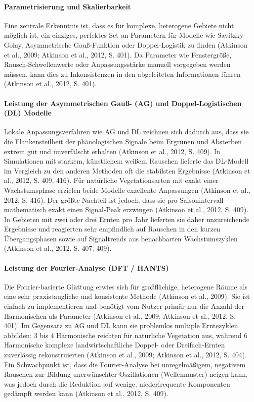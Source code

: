 \documentclass[11pt]{report}
\begin{document}
\paragraph{Parametrisierung und Skalierbarkeit}
Eine zentrale Erkenntnis ist, dass es für komplexe, heterogene Gebiete nicht möglich ist, ein einziges, perfektes Set an Parametern für Modelle wie Savitzky-Golay, Asymmetrische Gauß-Funktion oder Doppel-Logistik zu finden (Atkinson et al., 2009; Atkinson et al., 2012, S. 401). Da Parameter wie Fenstergröße, Rausch-Schwellenwerte oder Anpassungsstärke manuell vorgegeben werden müssen, kann dies zu Inkonsistenzen in den abgeleiteten Informationen führen (Atkinson et al., 2012, S. 401).

\paragraph{Leistung der Asymmetrischen Gauß- (AG) und Doppel-Logistischen (DL) Modelle}
Lokale Anpassungsverfahren wie AG und DL zeichnen sich dadurch aus, dass sie die Flankensteilheit der phänologischen Signale beim Ergrünen und Absterben extrem gut und unverfälscht erhalten (Atkinson et al., 2012, S. 409). In Simulationen mit starkem, künstlichem weißem Rauschen lieferte das DL-Modell im Vergleich zu den anderen Methoden oft die stabilsten Ergebnisse (Atkinson et al., 2012, S. 409, 416). Für natürliche Vegetationsarten mit exakt einer Wachstumsphase erzielen beide Modelle exzellente Anpassungen (Atkinson et al., 2012, S. 416). Der größte Nachteil ist jedoch, dass sie pro Saisonintervall mathematisch exakt einen Signal-Peak erzwingen (Atkinson et al., 2012, S. 409). In Gebieten mit zwei oder drei Ernten pro Jahr lieferten sie daher unzureichende Ergebnisse und reagierten sehr empfindlich auf Rauschen in den kurzen Übergangsphasen sowie auf Signaltrends aus benachbarten Wachstumszyklen (Atkinson et al., 2012, S. 407, 409).

\paragraph{Leistung der Fourier-Analyse (DFT / HANTS)}
Die Fourier-basierte Glättung erwies sich für großflächige, heterogene Räume als eine sehr praxistaugliche und konsistente Methode (Atkinson et al., 2009). Sie ist einfach zu implementieren und benötigt vom Nutzer primär nur die Anzahl der Harmonischen als Parameter (Atkinson et al., 2009; Atkinson et al., 2012, S. 401). Im Gegensatz zu AG und DL kann sie problemlos multiple Erntezyklen abbilden: 3 bis 4 Harmonische reichten für natürliche Vegetation aus, während 6 Harmonische komplexe landwirtschaftliche Doppel- oder Dreifach-Ernten zuverlässig rekonstruierten (Atkinson et al., 2009; Atkinson et al., 2012, S. 404). Ein Schwachpunkt ist, dass die Fourier-Analyse bei unregelmäßigem, negativem Rauschen zur Bildung unerwünschter Oszillationen (Wellenmuster) neigen kann, was jedoch durch die Reduktion auf wenige, niederfrequente Komponenten gedämpft werden kann (Atkinson et al., 2012, S. 409).
\end{document}

